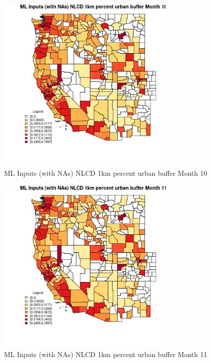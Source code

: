 \begin{figure} 
\centering  
\includegraphics[width=0.77\textwidth]{Code_Outputs/Report_ML_input_PM25_Step4_part_f_de_duplicated_aves_prioritize_24hr_obswNAs_CountyNLCD_1km_percent_urban_buffermedianMonth10.jpg} 
\caption{\label{fig:Report_ML_input_PM25_Step4_part_f_de_duplicated_aves_prioritize_24hr_obswNAsCountyNLCD_1km_percent_urban_buffermedianMonth10}ML Inputs (with NAs) NLCD 1km percent urban buffer Month 10} 
\end{figure} 
 

\clearpage 

\begin{figure} 
\centering  
\includegraphics[width=0.77\textwidth]{Code_Outputs/Report_ML_input_PM25_Step4_part_f_de_duplicated_aves_prioritize_24hr_obswNAs_CountyNLCD_1km_percent_urban_buffermedianMonth11.jpg} 
\caption{\label{fig:Report_ML_input_PM25_Step4_part_f_de_duplicated_aves_prioritize_24hr_obswNAsCountyNLCD_1km_percent_urban_buffermedianMonth11}ML Inputs (with NAs) NLCD 1km percent urban buffer Month 11} 
\end{figure} 
 


